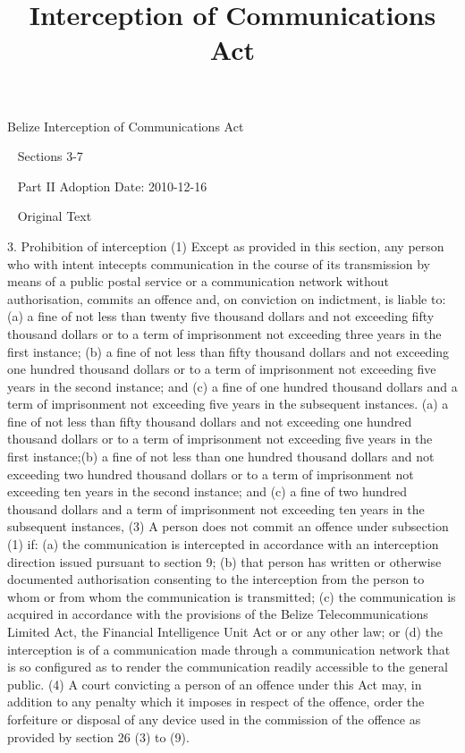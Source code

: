 \documentclass{article}
\title{Interception of Communications Act}
\author{}
\date{}
\begin{document}
\maketitle
Belize
Interception of Communications Act


 
Sections 3-7


 
Part II
Adoption Date:
2010-12-16


 
Original Text




3. Prohibition of interception
(1) Except as provided in this section, any person who with intent intecepts communication in the course of its transmission by means of a public postal service or a communication network without authorisation, commits an offence and, on conviction on indictment, is liable to:
(a) a fine of not less than twenty five thousand dollars and not exceeding fifty thousand dollars or to a term of imprisonment not exceeding three years in the first instance;
(b) a fine of not less than fifty thousand dollars and not exceeding one hundred thousand dollars or to a term of imprisonment not exceeding five years in the second instance; and 
(c) a fine of one hundred thousand dollars and a term of imprisonment not exceeding five years in the subsequent instances.
(a) a fine of not less than fifty thousand dollars and not exceeding one hundred thousand dollars or to a term of imprisonment not exceeding five years in the first instance;(b) a fine of not less than one hundred thousand dollars and not exceeding two hundred thousand dollars or to a term of imprisonment not exceeding ten years in the second instance; and
(c) a fine of two hundred thousand dollars and a term of imprisonment not exceeding ten years in the subsequent instances,
(3) A person does not commit an offence under subsection (1) if:
(a) the communication is intercepted in accordance with an interception direction issued pursuant to section 9;
(b) that person has written or otherwise documented authorisation consenting to the interception from the person to whom or from whom the communication is transmitted;
(c) the communication is acquired in accordance with the provisions of the Belize Telecommunications Limited Act, the Financial Intelligence Unit Act or or any other law; or
(d) the interception is of a communication made through a communication network that is so configured as to render the communication readily accessible to the general public.
(4) A court convicting a person of an offence under this Act may, in addition to any penalty which it imposes in respect of the offence, order the forfeiture or disposal of any device used in the commission of the offence as provided by section 26 (3) to (9).
\end{document}
